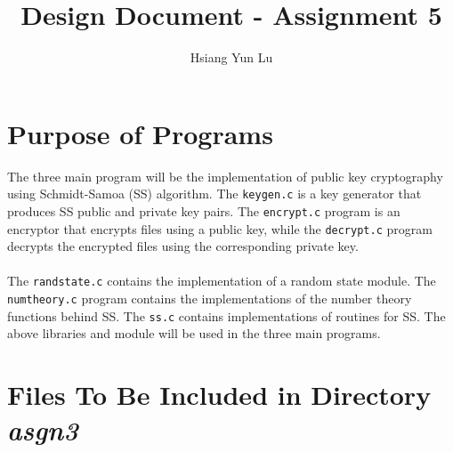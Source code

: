 \documentclass[12pt]{article}
\title{Design Document - Assignment 5}
\author{Hsiang Yun Lu}
\begin{document}
\maketitle

\section{Purpose of Programs}

The three main program will be the implementation of public key cryptography using Schmidt-Samoa (SS) algorithm. The \texttt{keygen.c} is a key generator that produces SS public and private key pairs. The \texttt{encrypt.c} program is an encryptor that encrypts files using a public key, while the \texttt{decrypt.c} program decrypts the encrypted files using the corresponding private key. \\
\\
The \texttt{randstate.c} contains the implementation of a random state module. The \texttt{numtheory.c} program contains the implementations of the number theory functions behind SS. The \texttt{ss.c} contains implementations of routines for SS. The above libraries and module will be used in the three main programs. \\
\section{Files To Be Included in Directory \textit{asgn3}}
\end{document}
